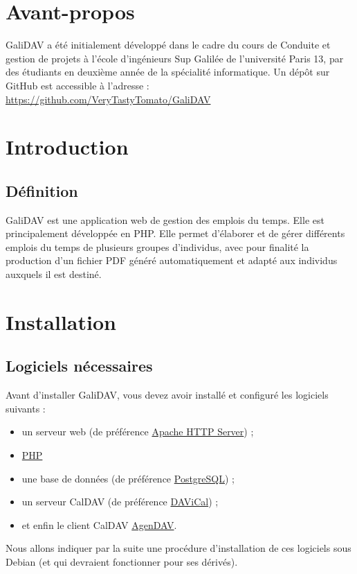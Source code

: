 \documentclass[a4paper, 11pt]{report}
\begin{document}
	\chapter*{Avant-propos}
		GaliDAV a été initialement développé dans le cadre du cours de Conduite et gestion de projets à l’école d’ingénieurs Sup Galilée de l’université Paris 13, par des étudiants en deuxième année de la spécialité informatique. Un dépôt sur GitHub est accessible à l’adresse : \url{https://github.com/VeryTastyTomato/GaliDAV}
	\chapter*{Introduction}
		\section*{Définition}
			GaliDAV est une application web de gestion des emplois du temps. Elle est principalement développée en PHP. Elle permet d’élaborer et de gérer différents emplois du temps de plusieurs groupes d’individus, avec pour finalité la production d’un fichier PDF généré automatiquement et adapté aux individus auxquels il est destiné.
	\chapter{Installation}
		\section{Logiciels nécessaires}
			Avant d’installer GaliDAV, vous devez avoir installé et configuré les logiciels suivants :
			\begin{itemize}
				\item un serveur web (de préférence \href{http://httpd.apache.org/}{Apache HTTP Server}) ;
				\item \href{http://php.net/}{PHP}
				\item une base de données (de préférence \href{http://www.postgresql.org/}{PostgreSQL}) ;
				\item un serveur CalDAV (de préférence \href{http://www.davical.org/}{DAViCal}) ;
				\item et enfin le client CalDAV \href{http://agendav.org/}{AgenDAV}.
			\end{itemize}

			Nous allons indiquer par la suite une procédure d’installation de ces logiciels sous Debian (et qui devraient fonctionner pour ses dérivés).
\end{document}
